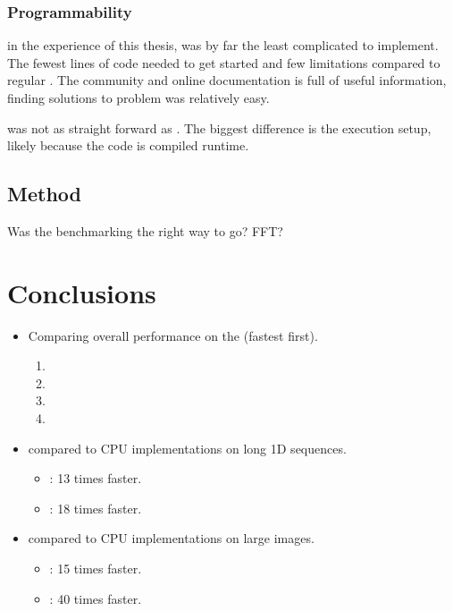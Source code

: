 \subsubsection{Programmability}

{\CU} in the experience of this thesis, {\CU} was by far the least complicated to implement. The fewest lines of code needed to get started and few limitations compared to regular {\CPP}. The {\CU} community and online documentation is full of useful information, finding solutions to problem was relatively easy.

{\OCL} was not as straight forward as {\CU}. The biggest difference is the execution setup, likely because the code is compiled runtime.

\subsection{Method}

Was the benchmarking the right way to go? FFT?

\section{Conclusions}

\begin{itemize}
	\item Comparing overall performance on the {\NVCARD} (fastest first).
	\begin{enumerate}	
		\item {\CU}
		\item {\DX}
		\item {\GL}
		\item {\OCL}
	\end{enumerate}
	\item {\CU} compared to CPU implementations on long 1D sequences.
	\begin{itemize}
		\item {\OMP}: 13 times faster.
		\item {\CPP}: 18 times faster.
	\end{itemize}
	\item {\CU} compared to CPU implementations on large images.
	\begin{itemize}
		\item {\OMP}: 15 times faster.
		\item {\CPP}: 40 times faster.
	\end{itemize}
\end{itemize}

